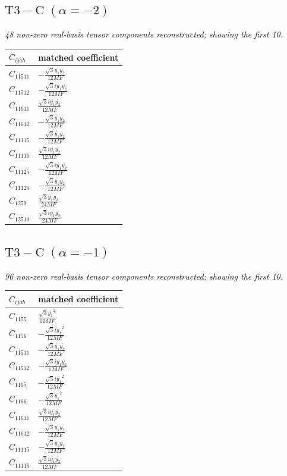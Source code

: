 \documentclass[9pt]{article}
\begin{document}
\subsection*{$ \mathrm{T3-C}\;(\alpha=-2) $}
\textit{48 non-zero real-basis tensor components reconstructed; showing the first 10.}
\begin{longtable}{@{}ll@{}}
\toprule
$C_{ijab}$ & matched coefficient \\
\midrule
$C_{11511}$ & $ - \frac{\sqrt{3} \overline{y_{1}} \overline{y_{2}}}{12 MF} $ \\
$C_{11512}$ & $ - \frac{\sqrt{3} i \overline{y_{1}} \overline{y_{2}}}{12 MF} $ \\
$C_{11611}$ & $ \frac{\sqrt{3} i \overline{y_{1}} \overline{y_{2}}}{12 MF} $ \\
$C_{11612}$ & $ - \frac{\sqrt{3} \overline{y_{1}} \overline{y_{2}}}{12 MF} $ \\
$C_{11115}$ & $ - \frac{\sqrt{3} \overline{y_{1}} \overline{y_{2}}}{12 MF} $ \\
$C_{11116}$ & $ \frac{\sqrt{3} i \overline{y_{1}} \overline{y_{2}}}{12 MF} $ \\
$C_{11125}$ & $ - \frac{\sqrt{3} i \overline{y_{1}} \overline{y_{2}}}{12 MF} $ \\
$C_{11126}$ & $ - \frac{\sqrt{3} \overline{y_{1}} \overline{y_{2}}}{12 MF} $ \\
$C_{1259}$ & $ \frac{\sqrt{3} \overline{y_{1}} \overline{y_{2}}}{24 MF} $ \\
$C_{12510}$ & $ \frac{\sqrt{3} i \overline{y_{1}} \overline{y_{2}}}{24 MF} $ \\
\bottomrule
\end{longtable}
\subsection*{$ \mathrm{T3-C}\;(\alpha=-1) $}
\textit{96 non-zero real-basis tensor components reconstructed; showing the first 10.}
\begin{longtable}{@{}ll@{}}
\toprule
$C_{ijab}$ & matched coefficient \\
\midrule
$C_{1155}$ & $ \frac{\sqrt{3} \overline{y_{1}}^{2}}{12 MF} $ \\
$C_{1156}$ & $ - \frac{\sqrt{3} i \overline{y_{1}}^{2}}{12 MF} $ \\
$C_{11511}$ & $ - \frac{\sqrt{3} \overline{y_{1}} \overline{y_{2}}}{12 MF} $ \\
$C_{11512}$ & $ - \frac{\sqrt{3} i \overline{y_{1}} \overline{y_{2}}}{12 MF} $ \\
$C_{1165}$ & $ - \frac{\sqrt{3} i \overline{y_{1}}^{2}}{12 MF} $ \\
$C_{1166}$ & $ - \frac{\sqrt{3} \overline{y_{1}}^{2}}{12 MF} $ \\
$C_{11611}$ & $ \frac{\sqrt{3} i \overline{y_{1}} \overline{y_{2}}}{12 MF} $ \\
$C_{11612}$ & $ - \frac{\sqrt{3} \overline{y_{1}} \overline{y_{2}}}{12 MF} $ \\
$C_{11115}$ & $ - \frac{\sqrt{3} \overline{y_{1}} \overline{y_{2}}}{12 MF} $ \\
$C_{11116}$ & $ \frac{\sqrt{3} i \overline{y_{1}} \overline{y_{2}}}{12 MF} $ \\
\bottomrule
\end{longtable}
\end{document}
